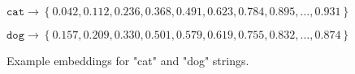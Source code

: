 \begin{figure}[H]
\[
\texttt{cat} \rightarrow \left\{
0.042, 0.112, 0.236, 0.368, 0.491, 0.623, 0.784, 0.895, \ldots, 0.931
\right\}
\]

\[
\texttt{dog} \rightarrow \left\{
0.157, 0.209, 0.330, 0.501, 0.579, 0.619, 0.755, 0.832, \ldots, 0.874
\right\}
\]
    \caption{Example embeddings for "cat" and "dog" strings.}
    \label{fig:example_embeddings_cat_dog}
\end{figure}
